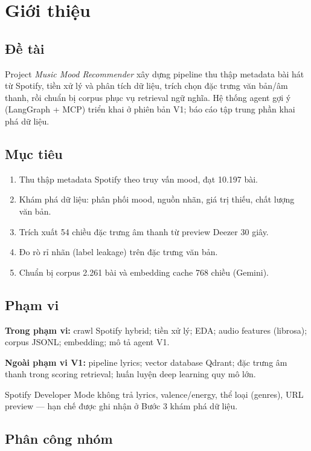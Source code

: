 \chapter{Giới thiệu}

\section{Đề tài}

Project \textit{Music Mood Recommender} xây dựng pipeline thu thập metadata bài hát từ Spotify, tiền xử lý và phân tích dữ liệu, trích chọn đặc trưng văn bản/âm thanh, rồi chuẩn bị corpus phục vụ retrieval ngữ nghĩa. Hệ thống agent gợi ý (LangGraph + MCP) triển khai ở phiên bản V1; báo cáo tập trung phần khai phá dữ liệu.

\section{Mục tiêu}

\begin{enumerate}[label=\arabic*.]
  \item Thu thập metadata Spotify theo truy vấn mood, đạt 10.197 bài.
  \item Khám phá dữ liệu: phân phối mood, nguồn nhãn, giá trị thiếu, chất lượng văn bản.
  \item Trích xuất 54 chiều đặc trưng âm thanh từ preview Deezer 30 giây.
  \item Đo rò rỉ nhãn (label leakage) trên đặc trưng văn bản.
  \item Chuẩn bị corpus 2.261 bài và embedding cache 768 chiều (Gemini).
\end{enumerate}

\section{Phạm vi}

\textbf{Trong phạm vi:} crawl Spotify hybrid; tiền xử lý; EDA; audio features (librosa); corpus JSONL; embedding; mô tả agent V1.

\textbf{Ngoài phạm vi V1:} pipeline lyrics; vector database Qdrant; đặc trưng âm thanh trong scoring retrieval; huấn luyện deep learning quy mô lớn.

Spotify Developer Mode không trả lyrics, valence/energy, thể loại (genres), URL preview --- hạn chế được ghi nhận ở Bước 3 khám phá dữ liệu.

\section{Phân công nhóm}

